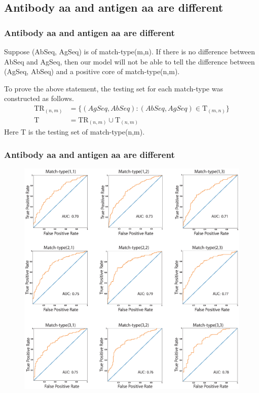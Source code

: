 \documentclass[hyperref={pdfpagelabels=false}]{beamer}
\begin{document}
\subsection{Antibody aa and antigen aa are different}

\begin{frame}
\frametitle{Antibody aa and antigen aa are different}
Suppose (AbSeq, AgSeq) is of match-type(m,n). If there is no difference between AbSeq and AgSeq, then our model will not be able to tell the difference between (AgSeq, AbSeq) and a positive core of match-type(n,m).\vspace{0.5cm}

To prove the above statement, the testing set for each match-type was constructed as follows.
\begin{align*}
	\text{TR}_{(n, m)} &= \{(AgSeq, AbSeq):(AbSeq, AgSeq)\in \text{T}_{(m, n)}\}\\
	\text{T} &=\text{TR}_{(n, m)} \cup \text{T}_{(n, m)}
\end{align*}
Here T is the testing set of match-type(n,m).
\end{frame}


\begin{frame}
\frametitle{Antibody aa and antigen aa are different}
\begin{figure}[H]
	\centering
	\includegraphics[scale=0.35]{Reverse.eps}
\end{figure}
\end{frame}
\end{document}
